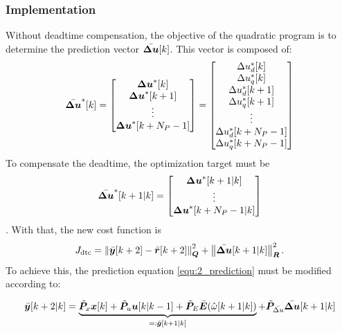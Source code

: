 \subsubsection{Implementation}
Without deadtime compensation, the objective of the quadratic program is to determine the prediction vector $\Bar{\bm{\Delta u}}[k]$. This vector is composed of:
\begin{align*}
	\Bar{ \boldsymbol{\Delta u}}^*[k] = \begin{bmatrix}
		{ \boldsymbol{\Delta u}}^*[k] \\
		{ \boldsymbol{\Delta u}}^*[k+1]\\
		\vdots\\
		{ \boldsymbol{\Delta u}}^*[k+N_P-1]
	\end{bmatrix}
	= 
	\begin{bmatrix}
		\Delta u_d^*[k] \\
		\Delta u_q^*[k] \\
		\Delta u_d^*[k+1] \\
		\Delta u_q^*[k+1] \\
		\vdots  \\
		\Delta u_d^*[k+N_P-1] \\
		\Delta u_q^*[k+N_P-1] 
	\end{bmatrix}
\end{align*}
To compensate the deadtime, the optimization target must be 
\begin{align*}
	\Bar{ \boldsymbol{\Delta u}}^*[k+1|k] = \begin{bmatrix}
		{ \boldsymbol{\Delta u}}^*[k+1|k]\\
		\vdots\\
		{ \boldsymbol{\Delta u}}^*[k+N_P-1|k]
	\end{bmatrix}
\end{align*}.
With that, the new cost function is 
\begin{equation}
	J_{\mathrm{dtc}}
	=
	\left\|
	\Bar{\boldsymbol{y}}[k+2]
	-
	\Bar{\boldsymbol{r}}[k+2]
	\right\|_{\bm{Q}}^2
	+
	\left\|
	\Bar{\boldsymbol{\Delta u}}[k+1|k]
	\right\|_{\bm{R}}^2.
	\label{equ:delComp_J_compact}
\end{equation}
To achieve this, the prediction equation \eqref{equ:2_prediction} must be modified according to:

\begin{equation}
\Bar{\boldsymbol{y}}[k+2|k] = \underbrace{ \Tilde{\boldsymbol{P}}_{x} {\boldsymbol{x}}[k]
	+ \Tilde{\boldsymbol{P}}_u \boldsymbol{u}[k|k-1] + \Tilde{\boldsymbol{P}}_{E}\Bar{\boldsymbol{E}}(\hat{\omega}[k+1|k]) }_{=:\Bar{\boldsymbol{g}}[k+1|k]} + \Tilde{\boldsymbol{P}}_{\Bar{\Delta u}} {\Bar{\boldsymbol{\Delta u}}}[k+1|k] 
	\label{equ:2_prediction_dtc}
\end{equation}


